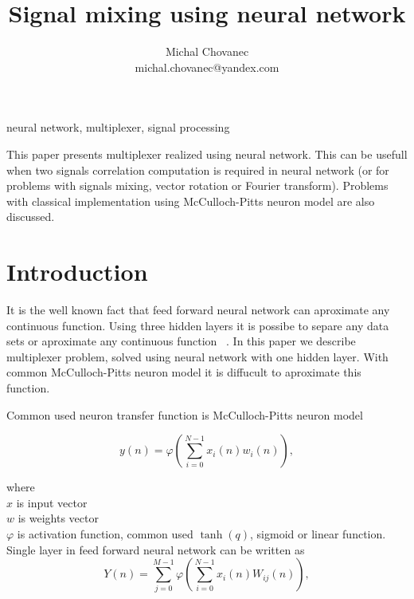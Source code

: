\documentclass[10pt,a5paper]{article}
\begin{document}
\title{Signal mixing using neural network}
\author{Michal Chovanec\\
michal.chovanec@yandex.com}
\date{}
\maketitle
\thispagestyle{empty}


 neural network, multiplexer, signal processing

 This paper presents multiplexer realized using neural network.
This can be usefull when two signals correlation computation is required in neural network
  (or for problems with signals mixing, vector rotation or Fourier transform).
  Problems with classical implementation using McCulloch-Pitts neuron model are also discussed.\\

\section{Introduction}

It is the well known fact that feed forward neural network can aproximate any continuous function.
Using three hidden layers it is possibe to separe any data sets or aproximate any continuous function ~\cite{bib:Aproximation}.
In this paper we describe multiplexer problem, solved using neural network with one hidden layer. With common
McCulloch-Pitts neuron model it is diffucult to aproximate this function.

Common used neuron transfer function is McCulloch-Pitts neuron model ~\cite{bib:McCullochPitts}

\begin{equation}
\label{McCulloch_Pitts}
  y(n) = \varphi(\sum_{i = 0}^{N-1} x_i(n)w_i(n)),
\end{equation}

where \\
$x$ is input vector \\
$w$ is weights vector \\
$\varphi$ is activation function, common used $\tanh(q)$, sigmoid or linear function. \\

Single layer in feed forward neural network can be written as ~\cite{bib:FeedForward}
\begin{equation}
\label{neurons_layer}
  Y(n) = \sum_{j = 0}^{M-1}\varphi(\sum_{i = 0}^{N-1} x_i(n)W_{ij}(n)),
\end{equation}
\end{document}
